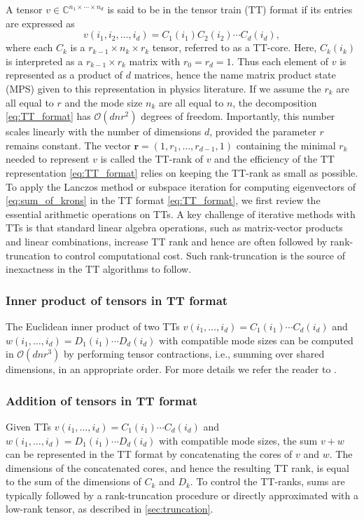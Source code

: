 \documentclass[10pt,preprint]{elsarticle}
\begin{document}
A tensor $v \in \mathbb{C}^{n_1 \times \cdots \times n_d}$ is said to be in the tensor train (TT) format if its entries are expressed as 
\begin{equation} \label{eq:TT_format} 
v(i_1, i_2, \ldots, i_d) = C_1(i_1) C_2(i_2) \cdots C_d(i_d),
\end{equation}
where each $C_k$ is a $r_{k-1} \times n_k \times r_{k}$ tensor, referred to as a TT-core. Here, $C_k(i_k)$ is interpreted as a $r_{k-1} \times r_k$ matrix with $r_0=r_d=1$. Thus each element of $v$ is represented as a product of $d$ matrices, hence the name matrix product state (MPS) given to this representation in physics literature. If we assume the $r_k$ are all equal to $r$ and the mode size $n_k$ are all equal to $n$, the decomposition \eqref{eq:TT_format} has $\mathcal{O}(dnr^2)$ degrees of freedom. Importantly, this number scales linearly with the number of dimensions $d$, provided the parameter $r$ remains constant. The vector $\bm r = (1,r_1,\ldots,r_{d-1},1)$ containing the minimal $r_k$ needed to represent $v$ is called the TT-rank of $v$ and the efficiency of the TT representation \eqref{eq:TT_format} relies on keeping the TT-rank as small as possible. To apply the Lanczos method or subspace iteration for computing eigenvectors of \eqref{eq:sum_of_krons} in the TT format \eqref{eq:TT_format}, we first review the essential arithmetic operations on TTs. A key challenge of iterative methods with TTs is that standard linear algebra operations, such as matrix-vector products and linear combinations, increase TT rank and hence are often followed by rank-truncation to control computational cost. Such rank-truncation is the source of inexactness in the TT algorithms to follow.

\subsubsection{Inner product of tensors in TT format}
The Euclidean inner product of two TTs $v(i_1,\ldots,i_d) = C_1(i_1)\cdots C_d(i_d)$ and $w(i_1,\ldots,i_d) = D_1(i_1)\cdots D_d(i_d)$ with compatible mode sizes can be computed in $\mathcal{O}(dnr^3)$ by performing tensor contractions, i.e., summing over shared dimensions, in an appropriate order. For more details we refer the reader to \cite[Algorithm 4]{oseledets2011tensor}. 

\subsubsection{Addition of tensors in TT format} 
\label{sec:addition}
Given TTs $v(i_1,\ldots,i_d) = C_1(i_1)\cdots C_d(i_d)$ and $w(i_1,\ldots,i_d) = D_1(i_1)\cdots D_d(i_d)$ with compatible mode sizes, the sum $v + w$ can be represented in the TT format by concatenating the cores of $v$ and $w$. The dimensions of the concatenated cores, and hence the resulting TT rank, is equal to the sum of the dimensions of $C_k$ and $D_k$. To control the TT-ranks, sums are typically followed by a rank-truncation procedure or directly approximated with a low-rank tensor, as described in \cref{sec:truncation}. 
\end{document}
